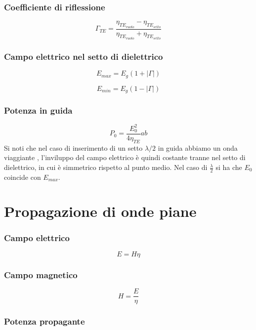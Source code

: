 \documentclass[10pt,a4paper]{report}
\begin{document}
		\subsection{Coefficiente di riflessione}

			\[
			\Gamma_{TE}=\frac{\eta_{TE_{vuoto}}-\eta_{TE_{setto}}}{\eta_{TE_{vuoto}}+\eta_{TE_{setto}}}
			\]
		\subsection{Campo elettrico nel setto di dielettrico}
		\[
		E_{max}=E_g(1+|\Gamma|)
		\]

		\[
		E_{min}=E_g(1-|\Gamma|)
		\]


		\subsection{Potenza in guida}
				\begin{equation}
				P_0=\frac{E_0^2}{4\eta_{TE}}ab
				\end{equation}
				Si noti che nel caso di inserimento di un setto $\lambda/2$ in guida abbiamo un onda viaggiante , l'inviluppo del campo elettrico è quindi costante tranne nel setto di dielettrico, in cui è simmetrico rispetto al punto medio.
				Nel caso di $\frac{\lambda}{2}$ si ha che $E_0$ coincide con $E_{max}$.
		

\chapter{Propagazione di onde piane}

	\subsection{Campo elettrico}

		\begin{equation}
		E=H\eta
		\label{eq:campo-elettrico}
		\end{equation}
		

	\subsection{Campo magnetico}
		\begin{equation}
		H=\frac{E}{\eta}
		\label{eq:campo-magnetico}
		\end{equation}
	

	\subsection{Potenza propagante}
\end{document}
